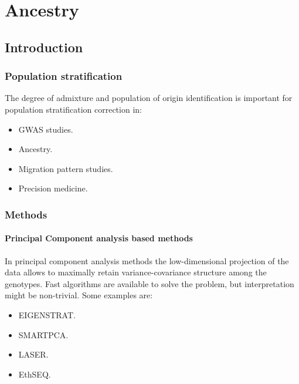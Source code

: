 \graphicspath{{chapters/laboratory/05/images}}
\chapter{Ancestry}

\section{Introduction}

	\subsection{Population stratification}
	The degree of admixture and population of origin identification is important for population stratification correction in:

	\begin{multicols}{4}
		\begin{itemize}
			\item GWAS studies.
			\item Ancestry.
			\item Migration pattern studies.
			\item Precision medicine.
		\end{itemize}
	\end{multicols}

	\subsection{Methods}

		\subsubsection{Principal Component analysis based methods}
		In principal component analysis methods the low-dimensional projection of the data allows to maximally retain variance-covariance structure among the genotypes.
		Fast algorithms are available to solve the problem, but interpretation might be non-trivial.
		Some examples are:

		\begin{multicols}{4}
			\begin{itemize}
				\item EIGENSTRAT.
				\item SMARTPCA.
				\item LASER.
				\item EthSEQ.
			\end{itemize}
		\end{multicols}

